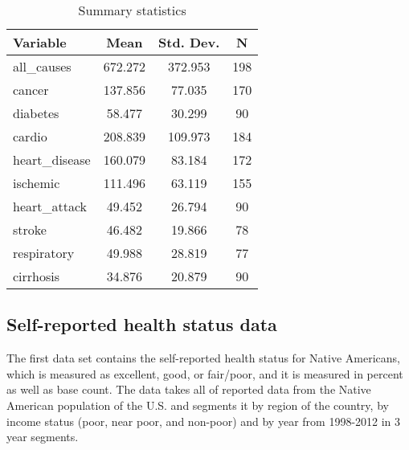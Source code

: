 \documentclass[12pt]{article}
\begin{document}
\begin{table}[htbp]\centering \caption{Summary statistics \label{sumstat}}
\begin{tabular}{ | l || c | c | c |}\hline\hline
\textbf{Variable} & \textbf{Mean} & \textbf{Std. Dev.} & \textbf{N} \\\hline
all\_causes & 672.272 & 372.953  & 198\\\hline
cancer & 137.856 & 77.035  & 170\\\hline
diabetes & 58.477 & 30.299  & 90\\\hline
cardio & 208.839 & 109.973  & 184\\\hline
heart\_disease & 160.079 & 83.184  & 172\\\hline
ischemic & 111.496 & 63.119  & 155\\\hline
heart\_attack & 49.452 & 26.794  & 90\\\hline
stroke & 46.482 & 19.866  & 78\\\hline
respiratory & 49.988 & 28.819  & 77\\\hline
cirrhosis & 34.876 & 20.879  & 90\\
\hline
\end{tabular}
\end{table}


\subsection{Self-reported health status data}
The first data set contains the self-reported health status for Native Americans, which is measured as excellent, good, or fair/poor, and it is measured in percent as well as base count.  The data takes all of reported data from the Native American population of the U.S. and segments it by region of the country, by income status (poor, near poor, and non-poor) and by year from 1998-2012 in 3 year segments.
\end{document}
